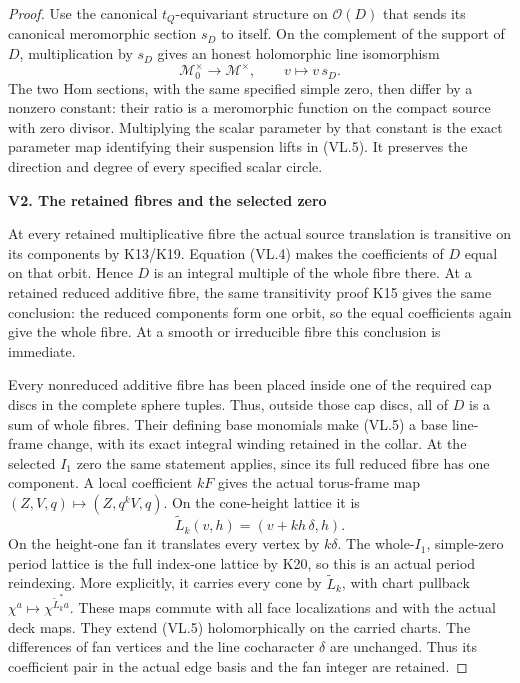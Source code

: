 \begin{proof}
Use the canonical \(t_Q\)-equivariant structure on
\(\mathcal O(D)\) that sends its canonical meromorphic
section \(s_D\) to itself. On the complement of the support
of \(D\), multiplication by \(s_D\) gives an honest
holomorphic line isomorphism
\[
 \mathcal M_0^\times\longrightarrow\mathcal M^\times,
                       \qquad v\longmapsto v\,s_D .
 \tag{VL.5}
\]
The two Hom sections, with the same specified simple zero,
then differ by a nonzero constant: their ratio is a
meromorphic function on the compact source with zero
divisor. Multiplying the scalar parameter by that constant
is the exact parameter map identifying their suspension
lifts in (VL.5). It preserves the direction and degree
of every specified scalar circle.

\par

\medskip\noindent\textbf{V2. The retained fibres and the selected zero}

\par\nobreak

At every retained multiplicative fibre the actual source
translation is transitive on its components by K13/K19.
Equation (VL.4) makes the coefficients of \(D\) equal on
that orbit. Hence \(D\) is an integral multiple of the
whole fibre there. At a retained reduced additive fibre,
the same transitivity proof K15 gives the same conclusion:
the reduced components form one orbit, so the equal
coefficients again give the whole fibre. At a smooth or
irreducible fibre this conclusion is immediate.

Every nonreduced additive fibre has been placed inside
one of the required cap discs in the complete sphere
tuples. Thus, outside those cap discs, all of \(D\) is a
sum of whole fibres. Their defining base monomials make
(VL.5) a base line-frame change, with its exact integral
winding retained in the collar. At the selected \(I_1\)
zero the same statement applies, since its full reduced
fibre has one component. A local coefficient \(kF\)
gives the actual torus-frame map
\((Z,V,q)\mapsto(Z,q^kV,q)\). On the cone-height lattice
it is
\[
 \widetilde L_k(v,h)=(v+k h\,\delta,h).
 \tag{VL.6}
\]
On the height-one fan it translates every vertex by
\(k\delta\). The whole-\(I_1\), simple-zero period lattice
is the full index-one lattice by K20, so this is an
actual period reindexing. More explicitly, it carries
every cone by \(\widetilde L_k\), with chart pullback
\(\chi^a\mapsto\chi^{\widetilde L_k^*a}\). These maps
commute with all face localizations and with the
actual deck maps. They extend (VL.5) holomorphically
on the carried charts. The differences of fan vertices
and the line cocharacter \(\delta\) are unchanged.
Thus its coefficient pair in the actual edge basis
and the fan integer are retained.


\end{proof}
